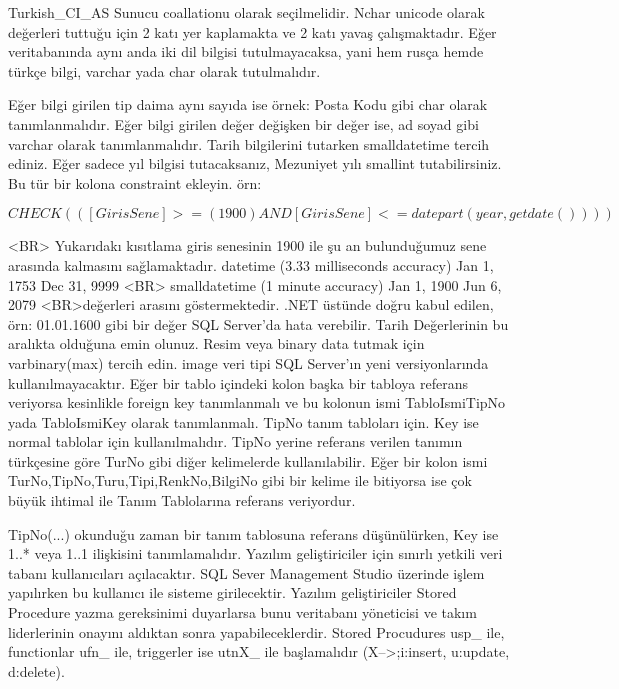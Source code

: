 \documentclass[10pt,a4paper,draft]{article}
\begin{document}
  
  			Turkish\_CI\_AS Sunucu coallationu olarak seçilmelidir. Nchar unicode 
  olarak değerleri tuttuğu için 	2 katı yer kaplamakta ve 2 katı yavaş 
  çalışmaktadır. Eğer veritabanında aynı anda iki dil bilgisi tutulmayacaksa, 
  yani			hem rusça hemde türkçe bilgi,  varchar yada char olarak tutulmalıdır.
  		 
 Eğer bilgi girilen tip daima aynı sayıda ise örnek: Posta Kodu gibi 
  char olarak tanımlanmalıdır.		 
  			Eğer bilgi girilen değer değişken bir değer ise, ad soyad gibi varchar 
  olarak tanımlanmalıdır.		 
  			Tarih bilgilerini tutarken smalldatetime tercih ediniz. 			
  Eğer sadece 
  yıl bilgisi tutacaksanız, Mezuniyet yılı smallint tutabilirsiniz. Bu tür bir 
  kolona constraint ekleyin.			örn: 
  
  $  CHECK  (([GirisSene]>=(1900) AND   [GirisSene]<=datepart(year,getdate()))) $
  
  			 <BR>			Yukarıdakı kısıtlama 
  giris senesinin 1900 ile şu an bulunduğumuz sene arasında kalmasını 
  sağlamaktadır.								 
  				datetime (3.33 milliseconds accuracy)  	Jan 1, 1753  	Dec 31, 9999
  				 <BR>				smalldatetime (1 minute accuracy) 	Jan 1, 1900 	Jun 6, 2079		
  				 <BR>değerleri arasını göstermektedir. .NET üstünde doğru kabul edilen, 
  örn: 01.01.1600 gibi bir değer SQL Server'da				hata verebilir. Tarih 
  Değerlerinin bu aralıkta olduğuna emin olunuz.						 
  			Resim veya binary data tutmak için varbinary(max) tercih edin. image 
  veri tipi SQL Server'ın yeni versiyonlarında			kullanılmayacaktır.		 
  			Eğer bir tablo içindeki kolon başka bir tabloya referans veriyorsa 
  kesinlikle foreign key tanımlanmalı ve bu			kolonun ismi TabloIsmiTipNo yada 
  TabloIsmiKey olarak tanımlanmalı. TipNo tanım tabloları için. Key ise normal 
  tablolar			için kullanılmalıdır.	
    TipNo yerine referans verilen tanımın türkçesine göre TurNo
    gibi diğer kelimelerde kullanılabilir.
    Eğer bir kolon ismi TurNo,TipNo,Turu,Tipi,RenkNo,BilgiNo
    gibi bir kelime ile bitiyorsa ise çok büyük ihtimal ile
    Tanım Tablolarına referans veriyordur.
    

  
  			TipNo(...) okunduğu zaman bir tanım tablosuna referans düşünülürken, Key ise 
  1..* veya 1..1 ilişkisini tanımlamalıdır.		 
  			Yazılım geliştiriciler için sınırlı yetkili veri tabanı kullanıcıları 
  açılacaktır. SQL Sever Management Studio üzerinde işlem			yapılırken bu 
  kullanıcı ile sisteme girilecektir.		 
  			Yazılım geliştiriciler Stored Procedure yazma gereksinimi duyarlarsa 
  bunu veritabanı yöneticisi ve takım liderlerinin onayını			 aldıktan sonra 
  yapabileceklerdir.		 
  			Stored Procudures usp\_ ile, functionlar ufn\_ ile, triggerler ise 
  utnX\_ ile başlamalıdır (X-->;i:insert, u:update, d:delete). 			
  
\end{document}
